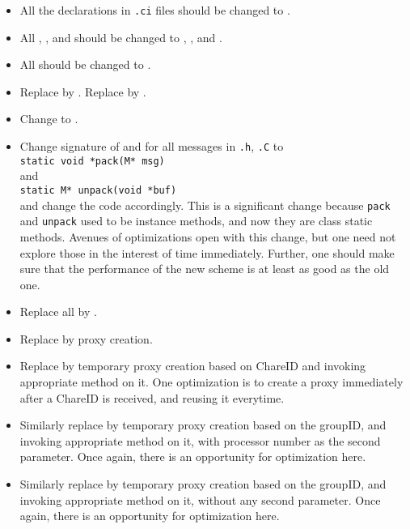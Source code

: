 \begin{itemize}
\item All the  declarations in {\tt *.ci} files should
be changed to . 

\item All , , and  should be changed
to , , and . 

\item All  should be changed to .

\item Replace  by . Replace  by .

\item Change  to .

\item Change signature of  and  for all
messages  in {\tt *.h}, {\tt *.C} to\\
\verb+static void *pack(M* msg)+\\
and\\
\verb+static M* unpack(void *buf)+\\
and change the code
accordingly. This is a significant change because {\tt pack} and {\tt unpack}
used to be instance methods, and now they are class static
methods.  Avenues of optimizations open with this change, but one need
not explore those in the interest of time immediately. Further, one
should make sure that the performance of the new scheme is at least as
good as the old one. 

\item Replace all  by .

\item Replace  by proxy creation.

\item Replace  by temporary proxy creation based on
ChareID and invoking appropriate method on it. One optimization is to
create a proxy immediately after a ChareID is received, and reusing it
everytime.

\item Similarly replace  by temporary proxy
creation based on the groupID, and invoking appropriate method on it,
with processor number as the second parameter. Once again, there is an
opportunity for optimization here. 

\item Similarly replace  by temporary proxy
creation based on the groupID, and invoking appropriate method on it,
without any second parameter. Once again, there is an opportunity for
optimization here. 


\end{itemize}
